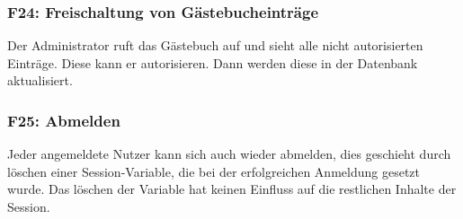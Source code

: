 \documentclass[10pt,a4paper]{scrartcl}
\begin{document}
%

\subsubsection*{F24: Freischaltung von Gästebucheinträge}

Der Administrator ruft das Gästebuch auf und sieht alle nicht autorisierten Einträge. Diese kann er autorisieren. Dann werden diese in der Datenbank aktualisiert.

\subsubsection*{F25: Abmelden}

Jeder angemeldete Nutzer kann sich auch wieder abmelden, dies geschieht durch löschen einer Session-Variable, die bei der erfolgreichen Anmeldung gesetzt wurde. Das löschen der Variable hat keinen Einfluss auf die restlichen Inhalte der Session.
\end{document}
